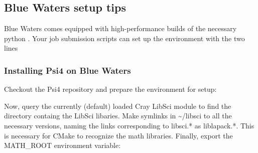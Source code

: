 \documentclass[letterpaper,10pt,english]{sphinxmanual}
\begin{document}
\subsection{Blue Waters setup tips}
\label{\detokenize{setup:blue-waters-setup-tips}}
Blue Waters comes equipped with high-performance builds of the necessary
python .  Your job submission scripts can set up the environment with the two lines

\begin{sphinxVerbatim}[commandchars=\\\{\}]
  
  
\end{sphinxVerbatim}


\subsubsection{Installing Psi4 on Blue Waters}
\label{\detokenize{setup:installing-psi4-on-blue-waters}}
Checkout the Psi4 repository and prepare the environment for setup:

\begin{sphinxVerbatim}[commandchars=\\\{\}]
  
  
 
 
 
\end{sphinxVerbatim}

Now, query the currently (default) loaded Cray LibSci module to find the
directory containg the LibSci libaries.  Make symlinks in \textasciitilde{}/libsci
to all the necessary versions, naming the links corresponding to libsci.*
as liblapack.*. This is necessary for CMake to recognize the math libraries.
Finally, export the MATH\_ROOT environment variable:

\begin{sphinxVerbatim}[commandchars=\\\{\}]
 
\end{sphinxVerbatim}
\end{document}
